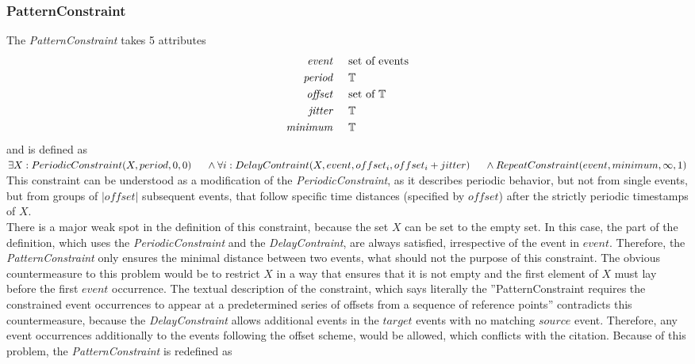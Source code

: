 		
	\subsubsection{PatternConstraint}
		\label{sec:patterConstraintDefinition}
		The \emph{PatternConstraint} takes 5 attributes
		\begin{align*}
			\emph{event} 	& \hspace{.5cm}\text{set of events}\\
			\emph{period} 	& \hspace{.5cm}\mathbb{T}\\
			\emph{offset}	& \hspace{.5cm} \text{set of }\mathbb{T}\\
			\emph{jitter}	& \hspace{.5cm}\mathbb{T}\\
			\emph{minimum}	& \hspace{.5cm}\mathbb{T}
		\end{align*}
		and is defined as \\[10pt]
		\begin{math}
			\exists X: PeriodicConstraint(X, period, 0, 0)\\
			\text{\hspace{.5cm}} \land \forall i: DelayContraint(X, event, offset_i, offset_i+jitter)\\
			\text{\hspace{.5cm}} \land RepeatConstraint(event, minimum, \infty, 1)
		\end{math}\\[10pt]
		This constraint can be understood as a modification of the \emph{PeriodicConstraint}, as it describes periodic behavior, but not from single events, but from groups of $|offset|$ subsequent events, that follow specific time distances (specified by $offset$) after the strictly periodic timestamps of $X$.\\
		There is a major weak spot in the definition of this constraint, because the set $X$ can be set to the empty set. In this case, the part of the definition, which uses the \emph{PeriodicConstraint} and the \emph{DelayContraint}, are always satisfied, irrespective of the event in $event$. Therefore, the \emph{PatternConstraint} only ensures the minimal distance between two events, what should not the purpose of this constraint. 
		The obvious countermeasure to this problem would be to restrict $X$ in a way that ensures that it is not empty and the first element of $X$ must lay before the first $event$ occurrence. The textual description of the constraint, which says literally the ''PatternConstraint requires the constrained event occurrences to appear at a predetermined series of offsets from a sequence of reference points'' contradicts this countermeasure, because the \emph{DelayConstraint} allows additional events in the $target$ events with no matching $source$ event. Therefore, any event occurrences additionally to the events following the offset scheme, would be allowed, which conflicts with the citation. Because of this problem, the \emph{PatternConstraint} is redefined as \\[10pt]
